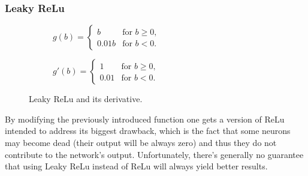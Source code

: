 \subsubsection{Leaky ReLu}
\vspace{3mm}
\begin{figure}[h]  
	\centering 
	\begin{subfigure}[b]{0.4\linewidth}
		\caption{$ g(b)= 
			\begin{cases}	
			b & \text{for $b \geq 0$,}\\
			0.01b & \text{for $b < 0$.}
			\end{cases}  $}    
	\end{subfigure}
	\begin{subfigure}[b]{0.4\linewidth}
		\caption{$ g'(b)= 
			\begin{cases}	
			1 & \text{for $b \geq 0$,}\\
			0.01 & \text{for $b < 0$.}
			\end{cases}  $}  
	\end{subfigure}
	\vspace{10mm}
	\caption{Leaky ReLu and its derivative.}
\end{figure}

By modifying the previously introduced function one gets a version of ReLu intended to address its biggest drawback, which is the fact that some neurons may become dead (their output will be always zero) and thus they do not contribute to the network's output. Unfortunately, there's generally no guarantee that using Leaky ReLu instead of ReLu will always yield better results. \cite{stanford-L4}

